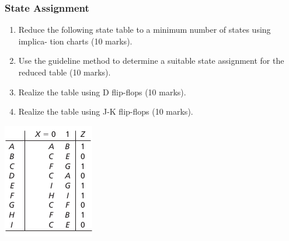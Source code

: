 \subsubsection*{State Assignment}
\begin{prob}
  \begin{enumerate}
  \item Reduce the following state table to a minimum number of states using implica-
    tion charts (10 marks).
  \item Use the guideline method to determine a suitable state assignment for the
    reduced table (10 marks).
  \item Realize the table using D flip-flops (10 marks).
  \item Realize the table using J-K flip-flops (10 marks).
  \end{enumerate}
  \includegraphics[width=0.5\linewidth]{fig-15.25.png}
\end{prob}


%
%
%
